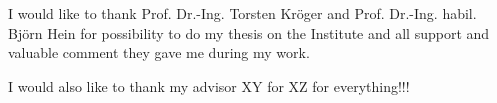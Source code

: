 I would like to thank 	Prof. Dr.-Ing. Torsten Kr\"oger and Prof. Dr.-Ing. habil. Bj\"orn Hein for possibility to do my thesis on the Institute and all support and valuable comment they gave me during my work.

I would also like to thank my advisor XY for XZ for everything!!!
